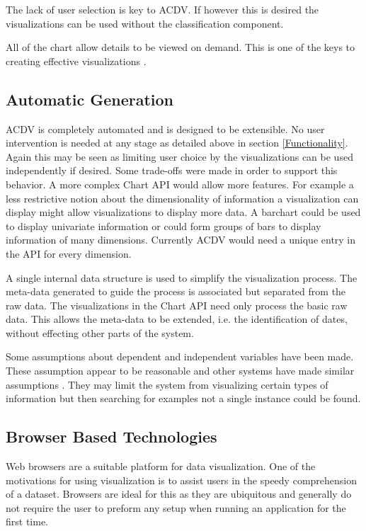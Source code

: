 \documentclass[a4paper, 11pt, titlepage, onehalfspacing]{report}
\begin{document}
The lack of user selection is key to AC\lightning{}DV. If however this is desired the visualizations can be used without the classification component.


All of the chart allow details to be viewed on demand. This is one of the keys to creating effective visualizations \cite{shneiderman1996eyes}. 

\subsection{Automatic Generation}
AC\lightning{}DV is completely automated and is designed to be extensible. No user intervention is needed at any stage as detailed above in section \ref{Functionality}. Again this may be seen as limiting user choice by the visualizations can be used independently if desired. Some trade-offs were made in order to support this behavior. A more complex Chart API would allow more features. For example a less restrictive notion about the dimensionality of information a visualization can display might allow visualizations to display more data. A barchart could be used to display univariate information or could form groups of bars to display information of many dimensions. Currently AC\lightning{}DV would need a unique entry in the API for every dimension.

A single internal data structure is used to simplify the visualization process. The meta-data generated to guide the process is associated but separated from the raw data. The visualizations in the Chart API need only process the basic raw data. This allows the meta-data to be extended, i.e. the identification of dates, without effecting other parts of the system. 

Some assumptions about dependent and independent variables have been made. These assumption appear to be reasonable and other systems have made similar assumptions \cite{stolte2002polaris}. They may limit the system from visualizing certain types of information but then searching for examples not a single instance could be found. 

\subsection{Browser Based Technologies}
Web browsers are a suitable platform for data visualization. One of the motivations for using visualization is to assist users in the speedy comprehension of a dataset. Browsers are ideal for this as they are ubiquitous and generally do not require the user to preform any setup when running an application for the first time.
\end{document}
